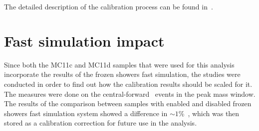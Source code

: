 The detailed description of the calibration process can be found in~\cite{lib:calib}.

\section{Fast simulation impact}

Since both the MC11c and MC11d samples that were used for this analysis incorporate the results of the frozen showers fast simulation, the studies were conducted in order to find out how the calibration results should be scaled for it. The measures were done on the central-forward \Zee\ events in the peak mass window. The results of the comparison between samples with enabled and disabled frozen showers fast simulation system showed a difference in $\sim 1$\%~\cite{lib:calib_support}, which was then stored as a calibration correction for future use in the analysis.
